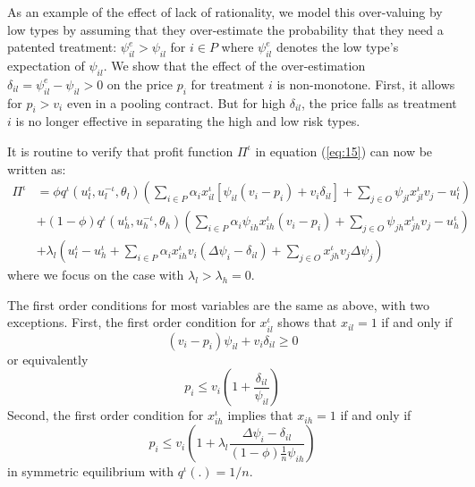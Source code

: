 \documentclass[12pt,english,a4paper]{article}
\begin{document}
As an example of the effect of lack of rationality, we model this over-valuing by low types by assuming that they over-estimate the probability that they need a patented treatment: \(\psi_{il}^e > \psi_{il}\) for \(i \in P\) where \(\psi_{il}^e\) denotes the low type's expectation of \(\psi_{il}\). We show that the effect of the over-estimation \(\delta_{il} = \psi_{il}^e-\psi_{il}>0\) on the price \(p_i\) for treatment \(i\) is non-monotone. First, it allows for \(p_i>v_i\) even in a pooling contract. But for high \(\delta_{il}\), the price falls as treatment \(i\) is no longer effective in separating the high and low risk types.

It is routine to verify that profit function \(\Pi^{\iota}\) in equation (\ref{eq:15}) can now be written as:
\begin{equation}
\label{eq:15b}
\begin{split}
\Pi^{\iota} &= \phi q^{\iota}(u_l^{\iota},u_l^{-\iota},\theta_l) (\sum_{i \in P} \alpha_i x_{il}^{\iota}[\psi_{il}(v_i-p_i)+v_i \delta_{il}] + \sum_{j \in O} \psi_{jl} x_{jl}^{\iota} v_j - u_l^{\iota}) \\
    &+ (1-\phi) q^{\iota}(u_h^{\iota},u_h^{-\iota},\theta_h) (\sum_{i \in P} \alpha_i \psi_{ih} x_{ih}^{\iota} (v_i-p_i) + \sum_{j \in O} \psi_{jh} x_{jh}^{\iota} v_j - u_h^{\iota}) \\
    &+ \lambda_l (u_l^{\iota} - u_h^{\iota} + \sum_{i \in P} \alpha_i x_{ih}^{\iota} v_i (\Delta\psi_{i}-\delta_{il}) + \sum_{j \in O} x_{jh}^{\iota} v_j \Delta\psi_{j})
\end{split}
\end{equation}
where we focus on the case with \(\lambda_l>\lambda_h =0\).

The first order conditions for most variables are the same as above, with two exceptions. First, the first order condition for \(x_{il}^{\iota}\) shows that \(x_{il}=1\) if and only if
\begin{equation}
\label{eq:44}
(v_i-p_i)\psi_{il}+v_i \delta_{il} \geq 0
\end{equation}
or equivalently
\begin{equation}
\label{eq:49}
p_i \leq v_i \left(1+\frac{\delta_{il}}{\psi_{il}} \right)
\end{equation}
Second, the first order condition for \(x_{ih}^{\iota}\) implies that \(x_{ih}=1\) if and only if
\begin{equation}
\label{eq:72}
p_i \leq v_i \left(1+\lambda_l \frac{\Delta \psi_i -\delta_{il}}{(1-\phi)\frac{1}{n} \psi_{ih}} \right)
\end{equation}
in symmetric equilibrium with \(q^{\iota}(.)=1/n\).
\end{document}
